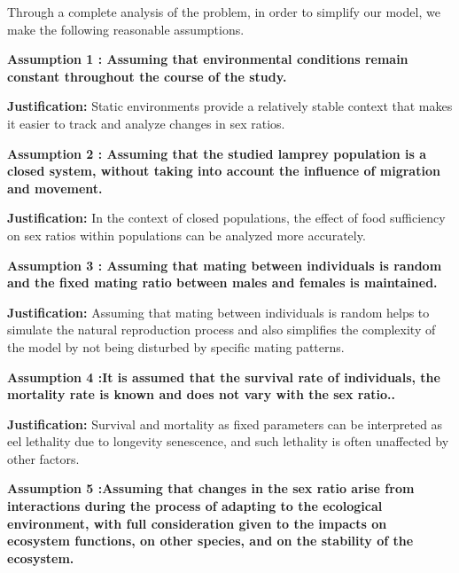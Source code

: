 \documentclass[CTeX = true]{mcmthesis}  %
\begin{document}
Through a complete analysis of the problem, in order to simplify our model, we make the following reasonable assumptions.

\textbf{Assumption 1 : Assuming that environmental conditions remain constant throughout the course of the study.}

\textbf{Justification: }Static environments provide a relatively stable context that makes it easier to track and analyze changes in sex ratios.

\textbf{Assumption 2 : Assuming that the studied lamprey population is a closed system, without taking into account the influence of migration and movement.}

\textbf{Justification: }In the context of closed populations, the effect of food sufficiency on sex ratios within populations can be analyzed more accurately.

\textbf{Assumption 3 : Assuming that mating between individuals is random and the fixed mating ratio between males and females is maintained.}

\textbf{Justification: }Assuming that mating between individuals is random helps to simulate the natural reproduction process and also simplifies the complexity of the model by not being disturbed by specific mating patterns.

\textbf{Assumption 4 :It is assumed that the survival rate of individuals, the mortality rate is known and does not vary with the sex ratio..}

\textbf{Justification: }Survival and mortality as fixed parameters can be interpreted as eel lethality due to longevity senescence, and such lethality is often unaffected by other factors.

\textbf{Assumption 5 :Assuming that changes in the sex ratio arise from interactions during the process of adapting to the ecological environment, with full consideration given to the impacts on ecosystem functions, on other species, and on the stability of the ecosystem.}
\end{document}
